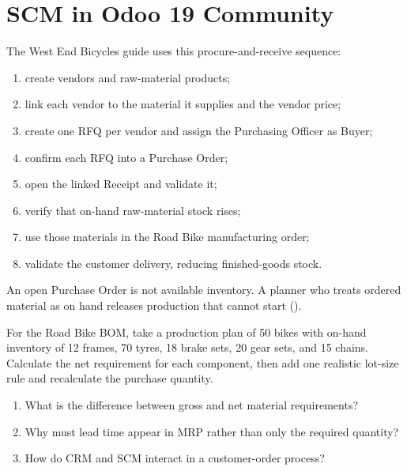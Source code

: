 \section{SCM in Odoo 19 Community}

\begin{applicationbox}
The West End Bicycles guide uses this procure-and-receive sequence:
\begin{enumerate}
  \item create vendors and raw-material products;
  \item link each vendor to the material it supplies and the vendor price;
  \item create one RFQ per vendor and assign the Purchasing Officer as Buyer;
  \item confirm each RFQ into a Purchase Order;
  \item open the linked Receipt and validate it;
  \item verify that on-hand raw-material stock rises;
  \item use those materials in the Road Bike manufacturing order;
  \item validate the customer delivery, reducing finished-goods stock.
\end{enumerate}
\end{applicationbox}

\begin{pitfall}
An open Purchase Order is not available inventory. A planner who treats ordered
material as on hand releases production that cannot start
().
\end{pitfall}

\begin{tryit}
For the Road Bike BOM, take a production plan of 50 bikes with on-hand inventory
of 12 frames, 70 tyres, 18 brake sets, 20 gear sets, and 15 chains. Calculate the
net requirement for each component, then add one realistic lot-size rule and
recalculate the purchase quantity.
\end{tryit}

\begin{quickcheck}
\begin{enumerate}
  \item What is the difference between gross and net material requirements?
  \item Why must lead time appear in MRP rather than only the required quantity?
  \item How do CRM and SCM interact in a customer-order process?
\end{enumerate}
\end{quickcheck}
